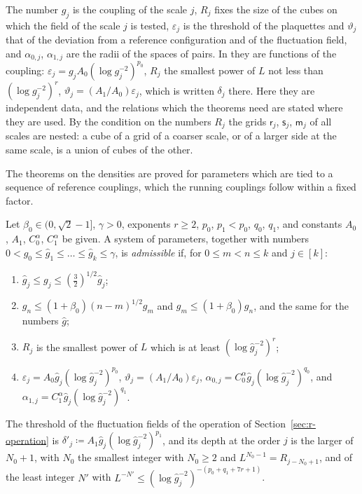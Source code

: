 \documentclass[11pt]{preprint}
\numberwithin{equation}{section}
\begin{document}
The number $g_j$ is the coupling of the scale $j$, $R_j$ fixes the size of the cubes on which the field of the scale $j$ is tested, $\varepsilon_j$ is the threshold of the plaquettes and $\vartheta_j$ that of the deviation from a reference configuration and of the fluctuation field, and $\alpha_{0,j}$, $\alpha_{1,j}$ are the radii of the spaces of pairs. In \cite[(2.4), (2.5), (2.28); p.~265]{BalabanCRE} they are functions of the coupling: $\varepsilon_j = g_jA_0(\log g_j^{-2})^{p_0}$, $R_j$ the smallest power of $L$ not less than $(\log g_j^{-2})^r$, $\vartheta_j = (A_1/A_0)\varepsilon_j$, which is written $\delta_j$ there. Here they are independent data, and the relations which the theorems need are stated where they are used. By the condition on the numbers $R_j$ the grids $\mathsf r_j$, $\mathsf s_j$, $\mathsf m_j$ of all scales are nested: a cube of a grid of a coarser scale, or of a larger side at the same scale, is a union of cubes of the other.

The theorems on the densities are proved for parameters which are tied to a sequence of reference couplings, which the running couplings follow within a fixed factor.

\begin{definition}\label{def:admissible}
Let $\beta_0 \in (0, \sqrt 2 - 1]$, $\gamma > 0$, exponents $r \geqslant 2$, $p_0$, $p_1 < p_0$, $q_0$, $q_1$, and constants $A_0$, $A_1$, $C^\alpha_0$, $C^\alpha_1$ be given. A system of parameters, together with numbers $0 < \hat g_0 \leqslant \hat g_1 \leqslant \dots \leqslant \hat g_k \leqslant \gamma$, is \emph{admissible} if, for $0 \leqslant m < n \leqslant k$ and $j \in [k]$:
\begin{enumerate}[label=(\roman*)]
\item $\hat g_j \leqslant g_j \leqslant (\frac{3}{2})^{1/2}\hat g_j$;
\item $g_n \leqslant (1 + \beta_0)(n - m)^{1/2}g_m$ and $g_m \leqslant (1 + \beta_0)g_n$, and the same for the numbers $\hat g$;
\item $R_j$ is the smallest power of $L$ which is at least $(\log\hat g_j^{-2})^r$;
\item $\varepsilon_j = A_0\hat g_j(\log\hat g_j^{-2})^{p_0}$, $\vartheta_j = (A_1/A_0)\varepsilon_j$, $\alpha_{0,j} = C^\alpha_0\hat g_j(\log\hat g_j^{-2})^{q_0}$, and $\alpha_{1,j} = C^\alpha_1\hat g_j(\log\hat g_j^{-2})^{q_1}$.
\end{enumerate}
The threshold of the fluctuation fields of the operation of Section~\ref{sec:r-operation} is $\delta'_j \coloneqq A_1\hat g_j(\log\hat g_j^{-2})^{p_1}$, and its depth at the order $j$ is the larger of $N_0 + 1$, with $N_0$ the smallest integer with $N_0 \geqslant 2$ and $L^{N_0-1} = R_{j-N_0+1}$, and of the least integer $N'$ with $L^{-N'} \leqslant (\log\hat g_j^{-2})^{-(p_0+q_1+7r+1)}$.
\end{definition}
\end{document}
